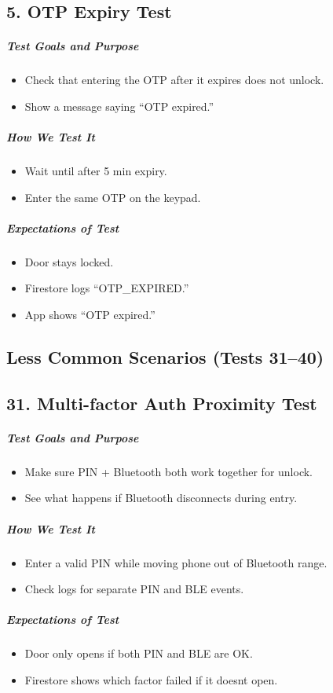 \subsection*{5. OTP Expiry Test}
\subparagraph{Test Goals and Purpose}
\begin{itemize}
    \item Check that entering the OTP after it expires does not unlock.
    \item Show a message saying “OTP expired.”
\end{itemize}
\subparagraph{How We Test It}
\begin{itemize}
    \item Wait until after 5 min expiry.
    \item Enter the same OTP on the keypad.
\end{itemize}
\subparagraph{Expectations of Test}
\begin{itemize}
    \item Door stays locked.
    \item Firestore logs “OTP\_EXPIRED.”
    \item App shows “OTP expired.”
\end{itemize}


\newpage
\subsection*{Less Common Scenarios (Tests 31–40)}

\subsection*{31. Multi-factor Auth Proximity Test}
\subparagraph{Test Goals and Purpose}
\begin{itemize}
    \item Make sure PIN + Bluetooth both work together for unlock.
    \item See what happens if Bluetooth disconnects during entry.
\end{itemize}
\subparagraph{How We Test It}
\begin{itemize}
    \item Enter a valid PIN while moving phone out of Bluetooth range.
    \item Check logs for separate PIN and BLE events.
\end{itemize}
\subparagraph{Expectations of Test}
\begin{itemize}
    \item Door only opens if both PIN and BLE are OK.
    \item Firestore shows which factor failed if it doesnt open.
\end{itemize}

